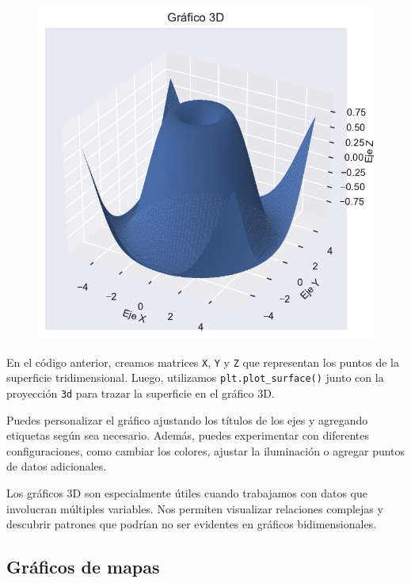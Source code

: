 \documentclass[
  a4paper,
]{article}
\begin{document}
\begin{figure}[H]

{\centering \includegraphics{index_files/figure-pdf/cell-16-output-1.pdf}

}

\end{figure}

En el código anterior, creamos matrices \texttt{X}, \texttt{Y} y
\texttt{Z} que representan los puntos de la superficie tridimensional.
Luego, utilizamos \texttt{plt.plot\_surface()} junto con la proyección
\texttt{\textquotesingle{}3d\textquotesingle{}} para trazar la
superficie en el gráfico 3D.

Puedes personalizar el gráfico ajustando los títulos de los ejes y
agregando etiquetas según sea necesario. Además, puedes experimentar con
diferentes configuraciones, como cambiar los colores, ajustar la
iluminación o agregar puntos de datos adicionales.

Los gráficos 3D son especialmente útiles cuando trabajamos con datos que
involucran múltiples variables. Nos permiten visualizar relaciones
complejas y descubrir patrones que podrían no ser evidentes en gráficos
bidimensionales.

\hypertarget{gruxe1ficos-de-mapas}{%
\subsection{Gráficos de mapas}\label{gruxe1ficos-de-mapas}}
\end{document}
